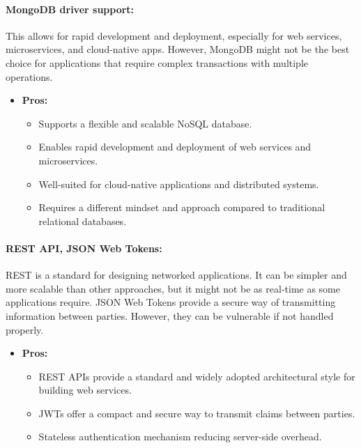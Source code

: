\documentclass[11pt,a4paper]{article}
\begin{document}
\paragraph{MongoDB driver support:} This allows for rapid development and deployment, especially for web services, microservices, and cloud-native apps. However, MongoDB might not be the best choice for applications that require complex transactions with multiple operations.
\begin{itemize}
    \item \textbf{Pros:}
          \begin{itemize}
              \item Supports a flexible and scalable NoSQL database.
              \item Enables rapid development and deployment of web services and microservices.
              \item Well-suited for cloud-native applications and distributed systems.
              \item Requires a different mindset and approach compared to traditional relational databases.
          \end{itemize}
\end{itemize}

\paragraph{REST API, JSON Web Tokens:} REST is a standard for designing networked applications. It can be simpler and more scalable than other approaches, but it might not be as real-time as some applications require. JSON Web Tokens provide a secure way of transmitting information between parties. However, they can be vulnerable if not handled properly.
\begin{itemize}
    \item \textbf{Pros:}
          \begin{itemize}
              \item REST APIs provide a standard and widely adopted architectural style for building web services.
              \item JWTs offer a compact and secure way to transmit claims between parties.
              \item Stateless authentication mechanism reducing server-side overhead.
          \end{itemize}
\end{itemize}
\end{document}
